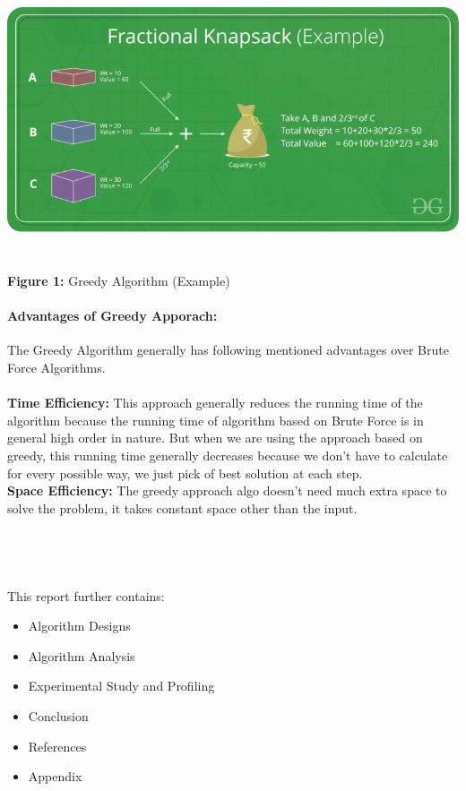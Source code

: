 \documentclass[10pt]{article}
\begin{document}
\begin{multicols*}{2}
\includegraphics[width=\columnwidth, height=8cm]{Fractional Knapsack.png}\begin{center}\textbf{Figure 1:} Greedy Algorithm (Example)\end{center}


\paragraph{Advantages of Greedy Apporach:}
The Greedy Algorithm generally has following mentioned advantages over Brute Force Algorithms.\\\\
\textbf{Time Efficiency: } This approach generally reduces the running time of the algorithm because the running time of algorithm based on Brute Force is in general high order in nature. But when we are using the approach based on greedy, this running time generally decreases because we don't have to calculate for every possible way, we just pick of best solution at each step. \\
\textbf{Space Efficiency: } The greedy approach algo doesn't need much extra space to solve the problem, it takes constant space other than the input. \\
\\\\\\\\This report further contains:
\begin{itemize}
\item 	Algorithm  Designs
\item 	Algorithm  Analysis
\item 	Experimental Study and Profiling
\item 	Conclusion
\item 	References
\item 	Appendix
\end{itemize}


\end{multicols*}
\end{document}
